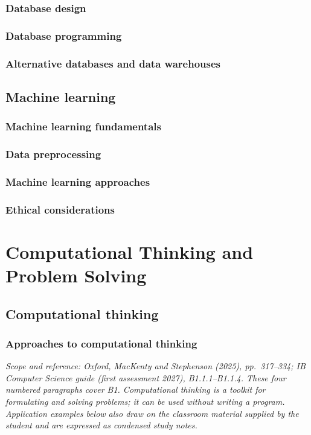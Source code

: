 \documentclass[a4paper,12pt]{article}
\begin{document}
\subsubsection{Database design}
\subsubsection{Database programming}
\subsubsection{Alternative databases and data warehouses}
\subsection{Machine learning}
\subsubsection{Machine learning fundamentals}
\subsubsection{Data preprocessing}
\subsubsection{Machine learning approaches}
\subsubsection{Ethical considerations}

\newpage
\section{Computational Thinking and Problem Solving}
\subsection{Computational thinking}
\subsubsection{Approaches to computational thinking}
\begingroup
\setlength{\emergencystretch}{3em}
\noindent\textit{Scope and reference: Oxford, MacKenty and Stephenson (2025), pp.~317--334; IB Computer Science guide (first assessment 2027), B1.1.1--B1.1.4. These four numbered paragraphs cover B1. Computational thinking is a toolkit for formulating and solving problems; it can be used without writing a program. Application examples below also draw on the classroom material supplied by the student and are expressed as condensed study notes.}
\end{document}

